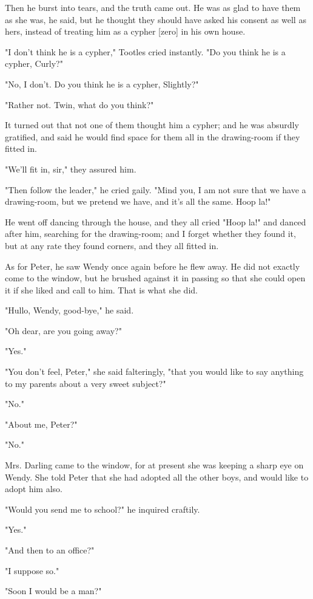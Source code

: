 Then he burst into tears, and the truth came out. He was as glad to have
them as she was, he said, but he thought they should have asked his
consent as well as hers, instead of treating him as a cypher [zero] in his
own house.


"I don't think he is a cypher," Tootles cried instantly. "Do you think he
is a cypher, Curly?"


"No, I don't. Do you think he is a cypher, Slightly?"


"Rather not. Twin, what do you think?"


It turned out that not one of them thought him a cypher; and he was
absurdly gratified, and said he would find space for them all in the
drawing-room if they fitted in.


"We'll fit in, sir," they assured him.


"Then follow the leader," he cried gaily. "Mind you, I am not sure that we
have a drawing-room, but we pretend we have, and it's all the same. Hoop
la!"


He went off dancing through the house, and they all cried "Hoop la!" and
danced after him, searching for the drawing-room; and I forget whether
they found it, but at any rate they found corners, and they all fitted in.


As for Peter, he saw Wendy once again before he flew away. He did not
exactly come to the window, but he brushed against it in passing so that
she could open it if she liked and call to him. That is what she did.


"Hullo, Wendy, good-bye," he said.


"Oh dear, are you going away?"


"Yes."


"You don't feel, Peter," she said falteringly, "that you would like to say
anything to my parents about a very sweet subject?"


"No."


"About me, Peter?"


"No."


Mrs. Darling came to the window, for at present she was keeping a sharp
eye on Wendy. She told Peter that she had adopted all the other boys, and
would like to adopt him also.


"Would you send me to school?" he inquired craftily.


"Yes."


"And then to an office?"


"I suppose so."


"Soon I would be a man?"


